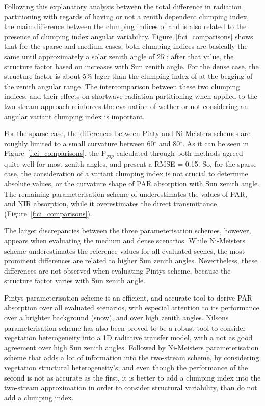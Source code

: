 Following this explanatory analysis between the total difference in radiation partitioning with regards of having or not a zenith dependent clumping index, the main difference between the clumping indices of \citet{pinty2006} and \citet{Ni-Meister2010} is also related to the presence of clumping index angular variability. Figure~\ref{f:ci_comparisons} shows that for the sparse and medium cases, both clumping indices are basically the same until approximately a solar zenith angle of 25$^{\circ}$; after that value, the structure factor based on \citet{pinty2006} increases with Sun zenith angle. For the dense case, the structure factor is about 5\% lager than the clumping index of \citet{Ni-Meister2010} at the begging of the zenith angular range. The intercomparison between these two clumping indices, and their effects on shortwave radiation partitioning when applied to the two-stream approach reinforces the evaluation of wether or not considering an angular variant clumping index is important. 

For the sparse case, the differences between Pinty and Ni-Meister\textquotesingle s schemes are roughly limited to a small curvature between 60$^{\circ}$ and 80$^{\circ}$. As it can be seen in Figure~\ref{f:ci_comparisons}, the P$_{gap}$ calculated through both methods agreed quite well for most zenith angles, and present a RMSE = 0.15. So, for the sparse case, the consideration of a variant clumping index is not crucial to determine absolute values, or the curvature shape of PAR absorption with Sun zenith angle. The remaining parameterisation scheme of \citet{Kucharik1999} underestimates the values of PAR, and NIR absorption, while it overestimates the direct transmittance (Figure~\ref{f:ci_comparisons}).

The larger discrepancies between the three parameterisation schemes, however, appears when evaluating the medium and dense scenarios. While Ni-Meister\textquotesingle s scheme underestimates the reference values for all evaluated scenes, the most prominent differences are related to higher Sun zenith angles. Nevertheless, these differences are not observed when evaluating Pinty\textquotesingle s scheme, because the structure factor varies with Sun zenith angle.

Pinty\textquotesingle s parameterisation scheme is an efficient, and accurate tool to derive PAR absorption over all evaluated scenarios, with especial attention to its performance over a brighter background (snow), and over high zenith angles. Nilson\textquotesingle s parameterisation scheme has also been proved to be a robust tool to consider vegetation heterogeneity into a 1D radiative transfer model, with a not as good agreement over high Sun zenith angles. Followed by Ni-Meister\textquotesingle s parameterisation scheme that adds a lot of information into the two-stream scheme, by considering vegetation structural heterogeneity's; and even though the performance of the second is not as accurate as the first, it is better to add a clumping index into the two-stream approximation in order to consider structural variability, than do not add a clumping index. 

